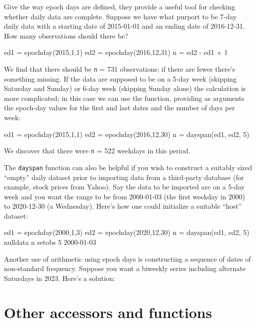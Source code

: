 Give the way epoch days are defined, they provide a useful tool for
checking whether daily data are complete. Suppose we have what purport
to be 7-day daily data with a starting date of 2015-01-01 and an
ending date of 2016-12-31. How many observations should there be?
%
\begin{code}
ed1 = epochday(2015,1,1)
ed2 = epochday(2016,12,31)
n = ed2 - ed1 + 1
\end{code}
We find that there should be \texttt{n} = 731 observations; if there
are fewer there's something missing. If the data are supposed to be
on a 5-day week (skipping Saturday and Sunday) or 6-day week (skipping
Sunday alone) the calculation is more complicated; in this case we can
use the  function, providing as arguments the
epoch-day values for the first and last dates and the number of days
per week:
\begin{code}
ed1 = epochday(2015,1,1)
ed2 = epochday(2016,12,30)
n = dayspan(ed1, ed2, 5)
\end{code}
%
We discover that there were \texttt{n} = 522 weekdays in this period.

The \texttt{dayspan} function can also be helpful if you wish to
construct a suitably sized ``empty'' daily dataset prior to importing
data from a third-party database (for example, stock prices from
\textsf{Yahoo}). Say the data to be imported are on a 5-day week and
you want the range to be from 2000-01-03 (the first weekday in 2000)
to 2020-12-30 (a Wednesday). Here's how one could initialize a
suitable ``host'' dataset:
\begin{code}
ed1 = epochday(2000,1,3)
ed2 = epochday(2020,12,30)
n = dayspan(ed1, ed2, 5)
nulldata n
setobs 5 2000-01-03
\end{code}

Another use of arithmetic using epoch days is constructing a sequence
of dates of non-standard frequency. Suppose you want a biweekly series
including alternate Saturdays in 2023. Here's a solution:

\section{Other accessors and functions}
\label{sec:cal-otherfuncs}


